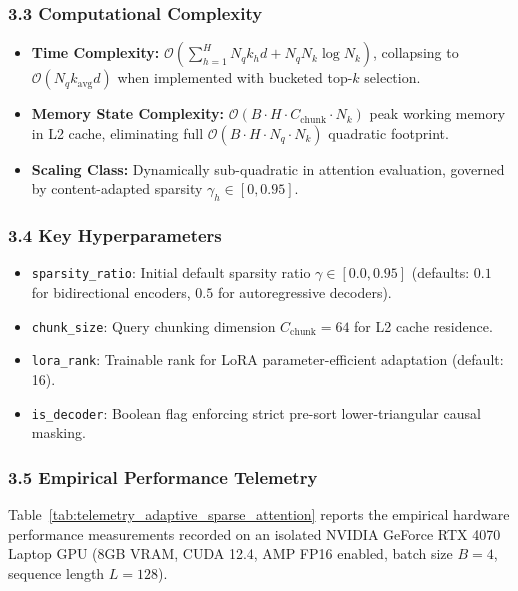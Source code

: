 \subsubsection*{3.3 Computational Complexity}
\begin{itemize}
    \item \textbf{Time Complexity:} $\mathcal{O}\left(\sum_{h=1}^H N_q k_h d + N_q N_k \log N_k\right)$, collapsing to $\mathcal{O}(N_q k_{\text{avg}} d)$ when implemented with bucketed top-$k$ selection.
    \item \textbf{Memory State Complexity:} $\mathcal{O}(B \cdot H \cdot C_{\text{chunk}} \cdot N_k)$ peak working memory in L2 cache, eliminating full $\mathcal{O}(B \cdot H \cdot N_q \cdot N_k)$ quadratic footprint.
    \item \textbf{Scaling Class:} Dynamically sub-quadratic in attention evaluation, governed by content-adapted sparsity $\gamma_h \in [0, 0.95]$.
\end{itemize}

\subsubsection*{3.4 Key Hyperparameters}
\begin{itemize}
    \item \texttt{sparsity\_ratio}: Initial default sparsity ratio $\gamma \in [0.0, 0.95]$ (defaults: $0.1$ for bidirectional encoders, $0.5$ for autoregressive decoders).
    \item \texttt{chunk\_size}: Query chunking dimension $C_{\text{chunk}} = 64$ for L2 cache residence.
    \item \texttt{lora\_rank}: Trainable rank for LoRA parameter-efficient adaptation (default: 16).
    \item \texttt{is\_decoder}: Boolean flag enforcing strict pre-sort lower-triangular causal masking.
\end{itemize}

\subsubsection*{3.5 Empirical Performance Telemetry}
Table~\ref{tab:telemetry_adaptive_sparse_attention} reports the empirical hardware performance measurements recorded on an isolated NVIDIA GeForce RTX 4070 Laptop GPU (8GB VRAM, CUDA 12.4, AMP FP16 enabled, batch size $B=4$, sequence length $L=128$).

